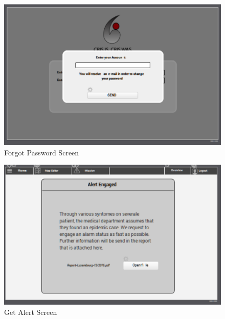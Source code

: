 \begin{figure}[htbp]
\begin{center}
 \caption{\label{fig:W1} Forgot Password Screen}
   \includegraphics[width=150mm]{./images/Web/forgot.eps}
\end{center}
\end{figure}
\begin{figure}[htbp]
\begin{center}
 \caption{\label{fig:W3} Get Alert Screen}
   \includegraphics[width=150mm]{./images/Web/cgetalert.eps}
\end{center}
\end{figure}
